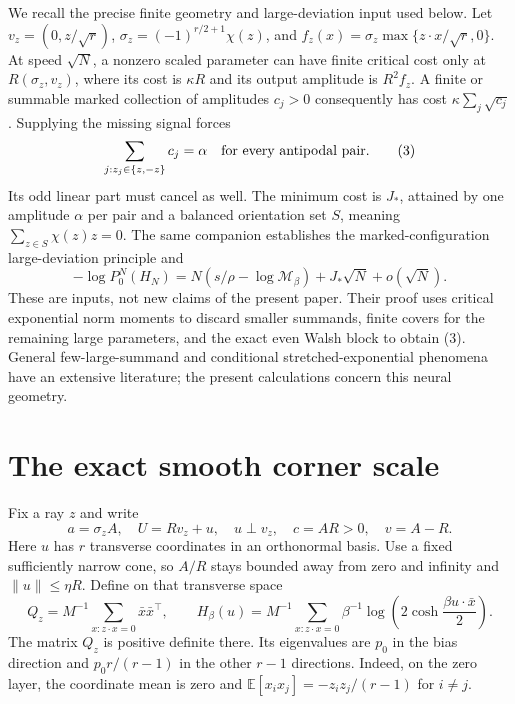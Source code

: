 \documentclass[11pt]{article}
\newcommand{\E}{\mathbb E}\newcommand{\R}{\mathbb R}
\begin{document}
We recall the precise finite geometry and large-deviation input used
below. Let $v_z=(0,z/\sqrt r)$,
$\sigma_z=(-1)^{r/2+1}\chi(z)$, and
$f_z(x)=\sigma_z\max\{z\cdot x/\sqrt r,0\}$.
At speed $\sqrt N$, a nonzero scaled parameter can have finite critical
cost only at $R(\sigma_z,v_z)$, where its cost is $\kappa R$ and its
output amplitude is $R^2f_z$. A finite or summable marked collection
of amplitudes $c_j>0$ consequently has cost
$\kappa\sum_j\sqrt{c_j}$. Supplying the missing signal forces
\[
 \sum_{j:z_j\in\{z,-z\}}c_j=\alpha
       \quad\hbox{for every antipodal pair}.              \tag{3}
\]
Its odd linear part must cancel as well. The minimum cost is $J_*$,
attained by one amplitude $\alpha$ per pair and a balanced orientation
set $S$, meaning $\sum_{z\in S}\chi(z)z=0$.
The same companion establishes the marked-configuration large-deviation
principle and
\[
 -\log P_0^N(H_N)=N(s/\rho-\log\mathcal M_\beta)
                                      +J_*\sqrt N+o(\sqrt N). \tag{4}
\]
These are inputs, not new claims of the present paper. Their proof uses
critical exponential norm moments to discard smaller summands, finite
covers for the remaining large parameters, and the exact even Walsh
block to obtain (3). General few-large-summand and conditional
stretched-exponential phenomena have an extensive literature; the
present calculations concern this neural geometry.

\section{The exact smooth corner scale}
Fix a ray $z$ and write
\[
 a=\sigma_z A,\quad U=Rv_z+u,\quad u\perp v_z,\quad
 c=AR>0,\quad v=A-R.
\]
Here $u$ has $r$ transverse coordinates in an orthonormal basis. Use a
fixed sufficiently narrow cone, so $A/R$ stays bounded away from zero
and infinity and $\|u\|\le\eta R$.
Define on that transverse space
\[
 Q_z=M^{-1}\sum_{x:z\cdot x=0}\bar x\bar x^\top,
 \qquad
 H_\beta(u)=M^{-1}\sum_{x:z\cdot x=0}
       \beta^{-1}\log\left(2\cosh\frac{\beta u\cdot\bar x}{2}\right).
 \tag{5}
\]
The matrix $Q_z$ is positive definite there. Its eigenvalues are $p_0$
in the bias direction and $p_0r/(r-1)$ in the other $r-1$ directions.
Indeed, on the zero layer, the coordinate mean is zero and
$\E[x_ix_j]=-z_iz_j/(r-1)$ for $i\ne j$.
\end{document}
